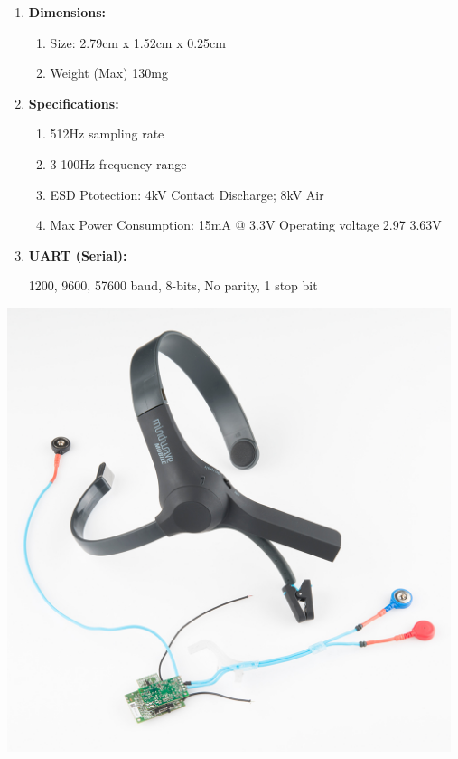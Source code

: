 \documentclass[12pt]{article}
\begin{document}
\begin{enumerate}
\begin{enumerate}
	\item \textbf{Dimensions:}


\begin{enumerate}
	\item Size: 2.79cm x 1.52cm x 0.25cm
	\item Weight (Max) 130mg
\end{enumerate}

	\item \textbf{Specifications:}


\begin{enumerate}
	\item 512Hz sampling rate
	\item 3-100Hz frequency range
	\item ESD Ptotection: 4kV Contact Discharge; 8kV Air
	\item Max Power Consumption: 15mA @ 3.3V Operating voltage 2.97 3.63V
\end{enumerate}


	\item \textbf{UART (Serial):}


{\raggedright
1200, 9600, 57600 baud, 8-bits, No parity, 1 stop bit
}
\end{enumerate}
\begin{center}
	\graphicspath{ {images/} }
	\includegraphics[width=13cm, height=13cm]{EEG_sensor}
\end{center}


\end{enumerate}
\end{document}
